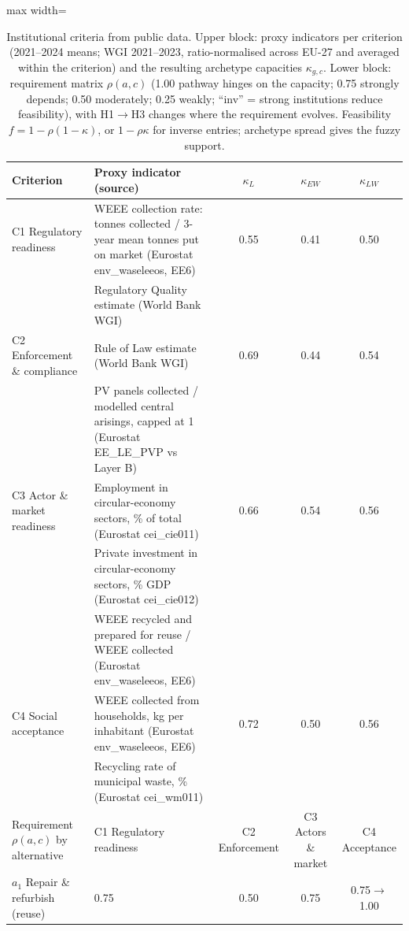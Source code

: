 \begin{table}[pos=t]\centering\scriptsize
\caption{Institutional criteria from public data. Upper block: proxy indicators per criterion (2021--2024 means; WGI 2021--2023, ratio-normalised across EU-27 and averaged within the criterion) and the resulting archetype capacities $\kappa_{g,c}$. Lower block: requirement matrix $\rho(a,c)$ (1.00 pathway hinges on the capacity; 0.75 strongly depends; 0.50 moderately; 0.25 weakly; ``inv'' = strong institutions reduce feasibility), with H1$\to$H3 changes where the requirement evolves. Feasibility $f=1-\rho(1-\kappa)$, or $1-\rho\kappa$ for inverse entries; archetype spread gives the fuzzy support.}
\label{tab:proxies}
\begin{adjustbox}{max width=\linewidth}\begin{tabular}{@{}p{3.1cm}p{8.6cm}ccc@{}}\toprule
Criterion & Proxy indicator (source) & $\kappa_L$ & $\kappa_{EW}$ & $\kappa_{LW}$ \\ \midrule
C1 Regulatory readiness & WEEE collection rate: tonnes collected / 3-year mean tonnes put on market (Eurostat env\_waseleeos, EE6) & 0.55 & 0.41 & 0.50 \\
 & Regulatory Quality estimate (World Bank WGI) &  & &  \\
\addlinespace
C2 Enforcement \& compliance & Rule of Law estimate (World Bank WGI) & 0.69 & 0.44 & 0.54 \\
 & PV panels collected / modelled central arisings, capped at 1 (Eurostat EE\_LE\_PVP vs Layer B) &  & &  \\
\addlinespace
C3 Actor \& market readiness & Employment in circular-economy sectors, \% of total (Eurostat cei\_cie011) & 0.66 & 0.54 & 0.56 \\
 & Private investment in circular-economy sectors, \% GDP (Eurostat cei\_cie012) &  & &  \\
 & WEEE recycled and prepared for reuse / WEEE collected (Eurostat env\_waseleeos, EE6) &  & &  \\
\addlinespace
C4 Social acceptance & WEEE collected from households, kg per inhabitant (Eurostat env\_waseleeos, EE6) & 0.72 & 0.50 & 0.56 \\
 & Recycling rate of municipal waste, \% (Eurostat cei\_wm011) &  & &  \\
\addlinespace
\midrule
Requirement $\rho(a,c)$ by alternative & C1 Regulatory readiness & C2 Enforcement & C3 Actors \& market & C4 Acceptance \\ \midrule
$a_1$ Repair \& refurbish (reuse) & 0.75 & 0.50 & 0.75 & 0.75$\to$1.00 \\

\end{tabular}
\end{adjustbox}
\end{table}
